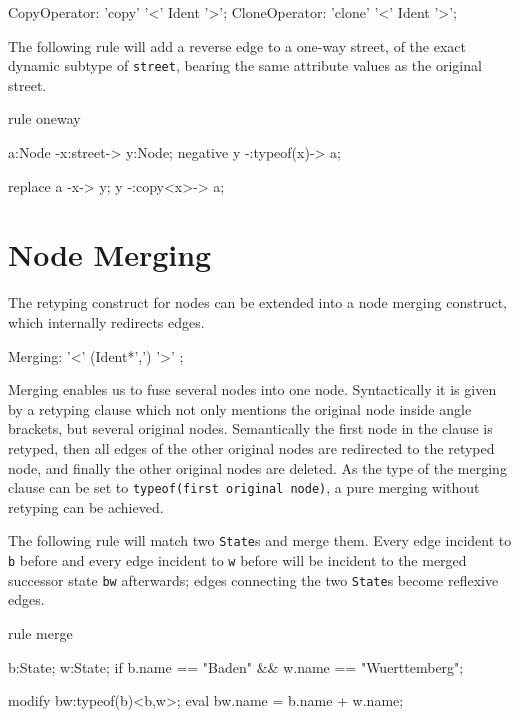 \begin{rail}
  CopyOperator: 'copy' '<' Ident '>';
  CloneOperator: 'clone' '<' Ident '>';
\end{rail}

\begin{example}
The following rule will add a reverse edge to a one-way street, of the exact dynamic subtype of \texttt{street}, bearing the same attribute values as the original street.
\begin{grgen}
rule oneway {
  a:Node -x:street-> y:Node;
  negative {
    y -:typeof(x)-> a;
  }

  replace {
    a -x-> y;
    y -:copy<x>-> a;
  }
}
\end{grgen}
\end{example}



\section{Node Merging} \label{sec:merge}
The retyping construct for nodes can be extended into a node merging construct,
which internally redirects edges.

\begin{rail}
  Merging: '<' (Ident*',') '>' ;
\end{rail}

Merging enables us to fuse several nodes into one node.
Syntactically it is given by a retyping clause which not only mentions the original node inside angle brackets, but several original nodes.
Semantically the first node in the clause is retyped, then all edges of the other original nodes are redirected to the retyped node, and finally the other original nodes are deleted.
As the type of the merging clause can be set to \texttt{typeof(first original node)}, a pure merging without retyping can be achieved.

\begin{example}
The following rule will match two \texttt{State}s and merge them.
Every edge incident to \texttt{b} before and every edge incident to \texttt{w} before will be incident to the merged successor state \texttt{bw} afterwards; edges connecting the two \texttt{State}s become reflexive edges.
\begin{grgen}
rule merge {
  b:State;
  w:State;
  if { b.name == "Baden" && w.name == "Wuerttemberg"; }

  modify {
    bw:typeof(b)<b,w>;
    eval { bw.name = b.name + w.name; }
  }
}
\end{grgen}
\end{example}



